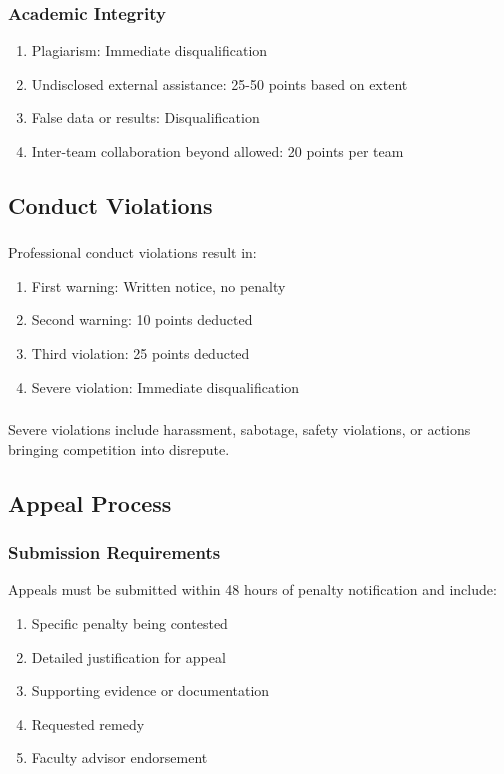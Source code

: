 \subsubsection{Academic Integrity}
\begin{enumerate}[noitemsep]
    \item Plagiarism: Immediate disqualification
    \item Undisclosed external assistance: 25-50 points based on extent
    \item False data or results: Disqualification
    \item Inter-team collaboration beyond allowed: 20 points per team
\end{enumerate}

\subsection{Conduct Violations}

\subsubsection{}
Professional conduct violations result in:
\begin{enumerate}[noitemsep]
    \item First warning: Written notice, no penalty
    \item Second warning: 10 points deducted
    \item Third violation: 25 points deducted
    \item Severe violation: Immediate disqualification
\end{enumerate}

\subsubsection{}
Severe violations include harassment, sabotage, safety violations, or actions bringing competition into disrepute.

\subsection{Appeal Process}

\subsubsection{Submission Requirements}
Appeals must be submitted within 48 hours of penalty notification and include:
\begin{enumerate}[noitemsep]
    \item Specific penalty being contested
    \item Detailed justification for appeal
    \item Supporting evidence or documentation
    \item Requested remedy
    \item Faculty advisor endorsement
\end{enumerate}

